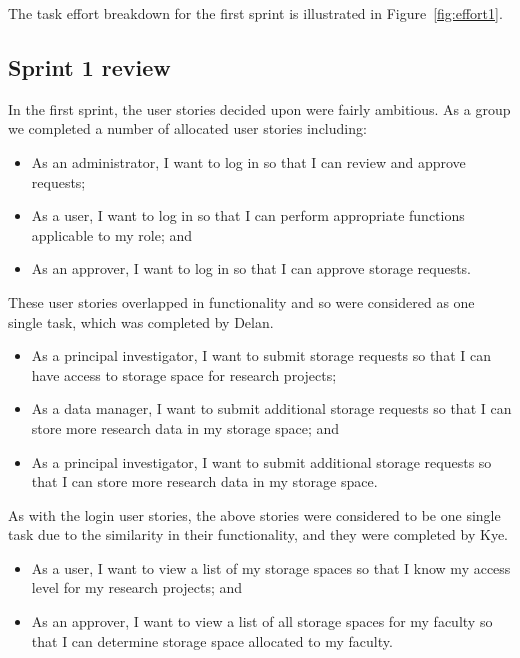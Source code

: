 \documentclass[a4paper,titlepage,12pt]{article}
\begin{document}
The task effort breakdown for the first sprint is illustrated in
Figure~\ref{fig:effort1}.

\subsection{Sprint 1 review}

In the first sprint, the user stories decided upon were fairly ambitious. As a
group we completed a number of allocated user stories including:

\begin{itemize}
	\item As an administrator, I want to log in so that I can review and
	      approve requests;
	\item As a user, I want to log in so that I can perform appropriate
	      functions applicable to my role; and
	\item As an approver, I want to log in so that I can approve storage
	      requests.
\end{itemize}

These user stories overlapped in functionality and so were considered as one
single task, which was completed by Delan.

\begin{itemize}
	\item As a principal investigator, I want to submit storage requests so
	      that I can have access to storage space for research projects;
	\item As a data manager, I want to submit additional storage requests
	      so that I can store more research data in my storage space; and
	\item As a principal investigator, I want to submit additional storage
	      requests so that I can store more research data in my storage
	      space.
\end{itemize}

As with the login user stories, the above stories were considered to be one
single task due to the similarity in their functionality, and they were
completed by Kye.

\begin{itemize}
	\item As a user, I want to view a list of my storage spaces so that I
	      know my access level for my research projects; and
	\item As an approver, I want to view a list of all storage spaces for
	      my faculty so that I can determine storage space allocated to my
	      faculty.
\end{itemize}
\end{document}
